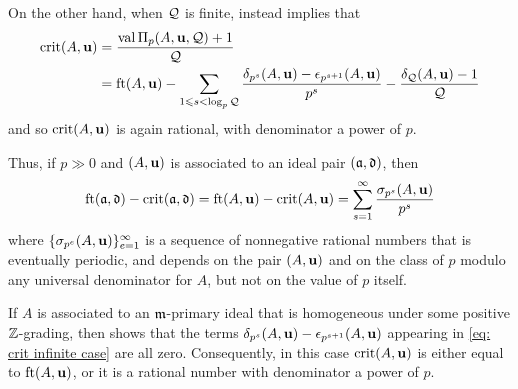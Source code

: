 \documentclass[11pt]{amsart}
\begin{document}
On the other hand, when $\mathcal{Q}$ is finite,  instead implies that
\begin{align*} 
\operatorname{crit}(A,\mathbf{u})& = \frac{\operatorname{val} \Pi_p(A,\mathbf{u}, \mathcal{Q}) +1}{\mathcal{Q}} \\ 
& = \operatorname{ft}(A, \mathbf{u}) -  \sum_{1 \leqslant s < \log_p \mathcal{Q}} \frac{\delta_{p^s}(A,\mathbf{u})-\epsilon_{p^{s+1}}(A,\mathbf{u})}{p^s} -  \frac{ \delta_{\mathcal{Q}}(A,\mathbf{u})-1}{\mathcal{Q}}
\end{align*}
and so $\operatorname{crit}(A,\mathbf{u})$ is again rational, with denominator a power of $p$.

Thus, if $p \gg 0$ and $(A,\mathbf{u})$ is associated to an ideal pair $(\mathfrak{a}, \mathfrak{d})$, then 
\[ \operatorname{ft}(\mathfrak{a}, \mathfrak{d}) - \operatorname{crit}(\mathfrak{a}, \mathfrak{d}) = \operatorname{ft}(A, \mathbf{u})-\operatorname{crit}(A,\mathbf{u}) = \sum_{s=1}^{\infty} \frac{ \sigma_{p^s}(A,\mathbf{u})}{p^s} \] 
where $\{ \sigma_{p^e}(A,\mathbf{u}) \}_{e=1}^{\infty}$ is a sequence of nonnegative rational numbers that is eventually periodic, and depends on the pair $(A,\mathbf{u})$ and on the class of $p$ modulo any universal denominator for $A$, but not on the value of $p$ itself.

\begin{remark}
   If $A$ is associated to an $\mathfrak{m}$-primary ideal that is homogeneous under some positive $\mathbb{Z}$-grading, then  shows that the terms $\delta_{p^s}(A,\mathbf{u})-\epsilon_{p^{s+1}}(A,\mathbf{u})$ appearing in \eqref{eq: crit infinite case} are all zero.
   Consequently, in this case $\operatorname{crit}(A,\mathbf{u})$ is either equal to $\operatorname{ft}(A, \mathbf{u})$, or it is a rational number with denominator a power of $p$.
\end{remark}
\end{document}
